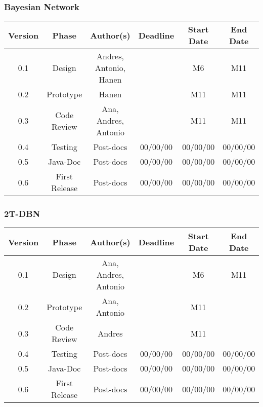 \subsubsection*{Bayesian Network}

\begin{table}[H]
\begin{tabular}{cccccc}
\hline
\textbf{Version} & \textbf{Phase} & \textbf{Author(s)} & \textbf{Deadline} & \textbf{Start Date} & \textbf{End Date}\\
\hline
0.1 & Design & Andres, Antonio, Hanen &  & M6 & M11\\
\hline 
0.2 & Prototype & Hanen &  & M11 & M11\\
\hline 
0.3 & Code Review & Ana, Andres, Antonio &  & M11  & M11\\
\hline 
0.4 & Testing & Post-docs & 00/00/00 & 00/00/00 & 00/00/00\\
\hline 
0.5 & Java-Doc  & Post-docs & 00/00/00 & 00/00/00 & 00/00/00\\
\hline 
0.6 & First Release & Post-docs & 00/00/00 & 00/00/00 & 00/00/00\\
\hline
\end{tabular}
\end{table}

\subsubsection*{2T-DBN}

\begin{table}[H]
\begin{tabular}{cccccc}
\hline
\textbf{Version} & \textbf{Phase} & \textbf{Author(s)} & \textbf{Deadline} & \textbf{Start Date} & \textbf{End Date}\\
\hline
0.1 & Design & Ana, Andres, Antonio &  & M6 & M11\\
\hline 
0.2 & Prototype & Ana, Antonio &  & M11 & \\
\hline 
0.3 & Code Review & Andres &  & M11 & \\
\hline 
0.4 & Testing & Post-docs & 00/00/00 & 00/00/00 & 00/00/00\\
\hline 
0.5 & Java-Doc  & Post-docs & 00/00/00 & 00/00/00 & 00/00/00\\
\hline 
0.6 & First Release & Post-docs & 00/00/00 & 00/00/00 & 00/00/00\\
\hline
\end{tabular}
\end{table}

